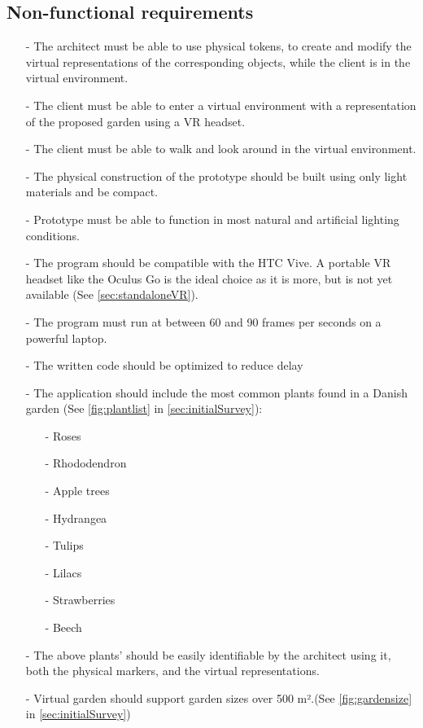 				\subsection{Non-functional requirements}
					\begin{itemize}
						\item[-] The architect must be able to use physical tokens, to create and modify the virtual representations of the corresponding objects, while the client is in the virtual environment.
						\item[-] The client must be able to enter a virtual environment with a representation of the proposed garden using a VR headset.
						\item[-] The client must be able to walk and look around in the virtual environment.
						
						\item[-] The physical construction of the prototype should be built using only light materials and be compact.		
						\item[-] Prototype must be able to function in most natural and artificial lighting conditions.
						
						\item[-] The program should be compatible with the HTC Vive. A portable VR headset like the Oculus Go is the ideal choice as it is more, but is not yet available (See \autoref{sec:standaloneVR}).
						\item[-] The program must run at between 60 and 90 frames per seconds on a powerful laptop.
						\item[-] The written code should be optimized to reduce delay
						\item[-] The application should include the most common plants found in a Danish garden (See \autoref{fig:plantlist} in \autoref{sec:initialSurvey}):
						\begin{itemize}
							\item[-] Roses
							\item[-] Rhododendron
							\item[-] Apple trees
							\item[-] Hydrangea
							\item[-] Tulips
							\item[-] Lilacs
							\item[-] Strawberries
							\item[-] Beech
						\end{itemize}
						\item[-] The above plants' should be easily identifiable by the architect using it, both the physical markers, and the virtual representations.
						\item[-] Virtual garden should support garden sizes over 500 m².(See \autoref{fig:gardensize} in \autoref{sec:initialSurvey}) 
						

\end{itemize}
